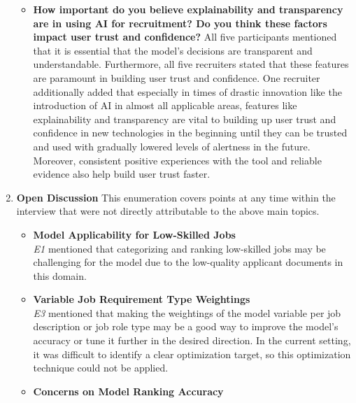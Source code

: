 \documentclass[draft,final]{thesisclass} %
\begin{document}
\begin{enumerate}
\begin{itemize}
        \item \textbf{How important do you believe explainability and transparency are in using \acs{AI} for recruitment? Do you think these factors impact user trust and confidence?}
        All five participants mentioned that it is essential that the model's decisions are transparent and understandable. Furthermore, all five recruiters stated that these features are paramount in building user trust and confidence. One recruiter additionally added that especially in times of drastic innovation like the introduction of \acs{AI} in almost all applicable areas, features like explainability and transparency are vital to building up user trust and confidence in new technologies in the beginning until they can be trusted and used with gradually lowered levels of alertness in the future. Moreover, consistent positive experiences with the tool and reliable evidence also help build user trust faster.
    \end{itemize}
    \item \textbf{Open Discussion}
    This enumeration covers points at any time within the interview that were not directly attributable to the above main topics.
    \begin{itemize}
        \item \textbf{Model Applicability for Low-Skilled Jobs}\\
        \textit{E1} mentioned that categorizing and ranking low-skilled jobs may be challenging for the model due to the low-quality applicant documents in this domain.
        \item \textbf{Variable Job Requirement Type Weightings}\\
        \textit{E3} mentioned that making the weightings of the model variable per job description or job role type may be a good way to improve the model's accuracy or tune it further in the desired direction. In the current setting, it was difficult to identify a clear optimization target, so this optimization technique could not be applied.
        \item \textbf{Concerns on Model Ranking Accuracy}\\

\end{itemize}
\end{enumerate}
\end{document}
